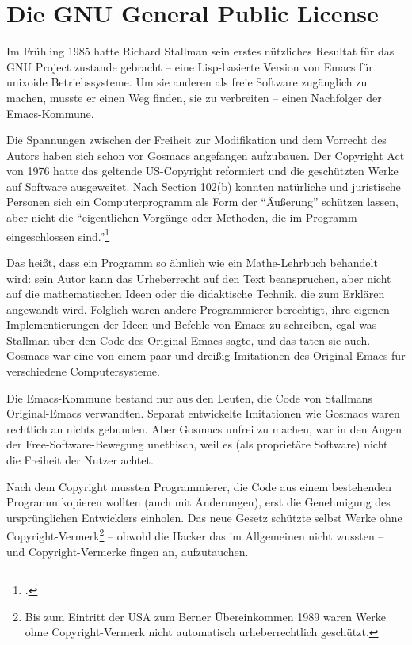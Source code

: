 \chapter{Die GNU General Public License}
\label{kap09}

Im Frühling 1985 hatte Richard Stallman sein erstes nützliches Resultat für das GNU Project zustande gebracht – eine Lisp-basierte Version von Emacs für unixoide Betriebssysteme. Um sie anderen als freie Software zugänglich zu machen, musste er einen Weg finden, sie zu verbreiten – einen Nachfolger der Emacs-Kommune.

Die Spannungen zwischen der Freiheit zur Modifikation und dem Vorrecht des Autors haben sich schon vor Gosmacs angefangen aufzubauen. Der Copyright Act von 1976 hatte das geltende US-Copyright reformiert und die geschützten Werke auf Software ausgeweitet. Nach Section 102(b) konnten natürliche und juristische Personen sich ein  Computerprogramm als Form der "`Äußerung"' schützen lassen, aber nicht die "`eigentlichen Vorgänge oder Methoden, die im Programm eingeschlossen sind."'\footcite[Vgl.][]{swcprl}

Das heißt, dass ein Programm so ähnlich wie ein Mathe-Lehrbuch behandelt wird: sein Autor kann das Urheberrecht auf den Text beanspruchen, aber nicht auf die mathematischen Ideen oder die didaktische Technik, die zum Erklären angewandt wird. Folglich waren andere Programmierer berechtigt, ihre eigenen Implementierungen der Ideen und Befehle von Emacs zu schreiben, egal was Stallman über den Code des Original-Emacs sagte, und das taten sie auch. Gosmacs war eine von einem paar und dreißig Imitationen des Original-Emacs für verschiedene Computersysteme.

Die Emacs-Kommune bestand nur aus den Leuten, die Code von Stallmans Original-Emacs verwandten. Separat entwickelte Imitationen wie Gosmacs waren rechtlich an nichts gebunden. Aber Gosmacs unfrei zu machen, war in den Augen der Free-Software-Bewegung unethisch, weil es (als proprietäre Software) nicht die Freiheit der Nutzer achtet.

Nach dem Copyright mussten Programmierer, die Code aus einem bestehenden Programm kopieren wollten (auch mit Änderungen), erst die Genehmigung des ursprünglichen Entwicklers einholen. Das neue Gesetz schützte selbst Werke ohne Copyright-Vermerk\footnote{Bis zum Eintritt der USA zum Berner Übereinkommen 1989 waren Werke ohne Copyright-Vermerk nicht automatisch urheberrechtlich geschützt.} – obwohl die Hacker das im Allgemeinen nicht wussten – und Copyright-Vermerke fingen an, aufzutauchen.

